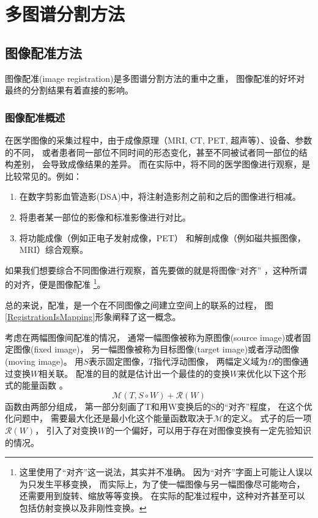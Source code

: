 
\chapter{多图谱分割方法}

\section{图像配准方法}
  图像配准(image registration)是多图谱分割方法的重中之重，
  图像配准的好坏对最终的分割结果有着直接的影响。

\subsection{图像配准概述}
在医学图像的采集过程中，由于成像原理（MRI, CT, PET, 超声等）、设备、参数的不同，
或者患者同一部位不同时间的形态变化，甚至不同被试者同一部位的结构差别，
会导致成像结果的差异。
而在实际中，将不同的医学图像进行观察，是比较常见的。例如：
\begin{enumerate}
  \item 在数字剪影血管造影(DSA)中，将注射造影剂之前和之后的图像进行相减。
  \item 将患者某一部位的影像和标准影像进行对比。
  \item 将功能成像（例如正电子发射成像，PET）%
    和解剖成像（例如磁共振图像，MRI）综合观察。
\end{enumerate}
如果我们想要综合不同图像进行观察，首先要做的就是将图像``对齐''
，这种所谓的对齐，便是图像配准
\footnote{这里使用了``对齐''这一说法，其实并不准确。
因为``对齐''字面上可能让人误以为只发生平移变换，
而实际上，为了使一幅图像与另一幅图像尽可能吻合，
还需要用到旋转、缩放等等变换。
在实际的配准过程中，这种对齐甚至可以包括仿射变换以及非刚性变换。}。

总的来说，配准，是一个在不同图像之间建立空间上的联系的过程，
图\ref{RegistrationIsMapping}形象阐释了这一概念。



考虑在两幅图像间配准的情况，
通常一幅图像被称为原图像(source image)或者固定图像(fixed image)，
另一幅图像被称为目标图像(target image)或者浮动图像(moving image)。
用$S$表示固定图像，$T$指代浮动图像，
两幅定义域为$\Omega$的图像通过变换$W$相关联。
配准的目的就是估计出一个最佳的的变换$W$来优化以下这个形式的能量函数
。
\begin{equation}\label{LossFunction}
\mathcal{M}(T,S\circ W)+\mathcal{R}(W)
\end{equation}
函数由两部分组成，
第一部分刻画了T和用W变换后的S的``对齐''程度，
在这个优化问题中，
需要最大化还是最小化这个能量函数取决于$\mathcal{M}$的定义。
式子的后一项$\mathcal{R}(W)$，
引入了对变换$W$的一个偏好，可以用于存在对图像变换有一定先验知识的情况。

